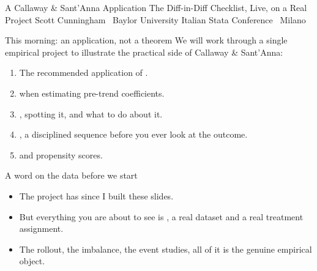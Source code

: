 \documentclass[aspectratio=169,11pt]{beamer}
\begin{document}

\codechellatitle
  {A Callaway \& Sant'Anna Application}
  {The Diff-in-Diff Checklist, Live, on a Real Project}
  {Scott Cunningham \textperiodcentered\ Baylor University}
  {Italian Stata Conference \textperiodcentered\ Milano}


\begin{frame}{This morning: an application, not a theorem}
\vspace{0.4em}
We will work through a single empirical project to illustrate the practical side of Callaway \& Sant'Anna:
\vspace{0.5em}
\begin{enumerate}\setlength\itemsep{0.5em}
  \item[(a)] The recommended application of .
  \item[(b)]  when estimating pre-trend coefficients.
  \item[(c)] , spotting it, and what to do about it.
  \item[(d)] , a disciplined sequence before you ever look at the outcome.
  \item[(e)]  and propensity scores.
\end{enumerate}
\vspace{0.6em}
\end{frame}

\begin{frame}{A word on the data before we start}
\vspace{0.8em}
\begin{itemize}\setlength\itemsep{0.7em}
  \item The project has  since I built these slides.
  \item But everything you are about to see is , a real dataset and a real treatment assignment.
  \item {} The rollout, the imbalance, the event studies, all of it is the genuine empirical object.
\end{itemize}
\end{frame}
\end{document}
